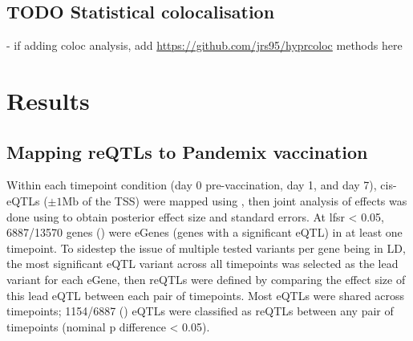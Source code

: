 \subsection{TODO Statistical colocalisation}

%
- if adding coloc analysis, add \url{https://github.com/jrs95/hyprcoloc} methods here

\section{Results}

\subsection{Mapping reQTLs to Pandemix vaccination}

Within each timepoint condition (day 0 pre-vaccination, day 1, and day 7), cis-\glspl{eQTL} ($\pm 1 \text{Mb}$ of the \gls{TSS}) were mapped using ,
then joint analysis of effects was done using  to obtain posterior effect size and standard errors.
At \gls{lfsr} < 0.05, 6887/13570 genes () were eGenes (genes with a significant \gls{eQTL}) in at least one timepoint.
To sidestep the issue of multiple tested variants per gene being in \gls{LD},
the most significant \gls{eQTL} variant across all timepoints was selected as the lead variant for each eGene,
then \glspl{reQTL} were defined by comparing the effect size of this lead \gls{eQTL} between each pair of timepoints.
Most \glspl{eQTL} were shared across timepoints; 1154/6887 () \glspl{eQTL} were classified as \glspl{reQTL} between any pair of timepoints (nominal p difference < 0.05).

